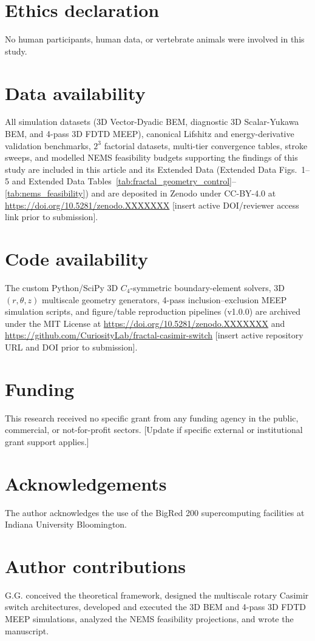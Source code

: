 \documentclass[11pt, a4paper]{article}
\begin{document}
\section*{Ethics declaration}
No human participants, human data, or vertebrate animals were involved in this study.

\section*{Data availability}
All simulation datasets (3D Vector-Dyadic BEM, diagnostic 3D Scalar-Yukawa BEM, and 4-pass 3D FDTD MEEP), canonical Lifshitz and energy-derivative validation benchmarks, $2^3$ factorial datasets, multi-tier convergence tables, stroke sweeps, and modelled NEMS feasibility budgets supporting the findings of this study are included in this article and its Extended Data (Extended Data Figs.~1--5 and Extended Data Tables~\ref{tab:fractal_geometry_control}--\ref{tab:nems_feasibility}) and are deposited in Zenodo under CC-BY-4.0 at \url{https://doi.org/10.5281/zenodo.XXXXXXX} [insert active DOI/reviewer access link prior to submission].

\section*{Code availability}
The custom Python/SciPy 3D $C_4$-symmetric boundary-element solvers, 3D $(r,\theta,z)$ multiscale geometry generators, 4-pass inclusion--exclusion MEEP simulation scripts, and figure/table reproduction pipelines (v1.0.0) are archived under the MIT License at \url{https://doi.org/10.5281/zenodo.XXXXXXX} and \url{https://github.com/CuriosityLab/fractal-casimir-switch} [insert active repository URL and DOI prior to submission].

\section*{Funding}
This research received no specific grant from any funding agency in the public, commercial, or not-for-profit sectors. [Update if specific external or institutional grant support applies.]

\section*{Acknowledgements}
The author acknowledges the use of the BigRed 200 supercomputing facilities at Indiana University Bloomington.

\section*{Author contributions}
G.G. conceived the theoretical framework, designed the multiscale rotary Casimir switch architectures, developed and executed the 3D BEM and 4-pass 3D FDTD MEEP simulations, analyzed the NEMS feasibility projections, and wrote the manuscript.
\end{document}
